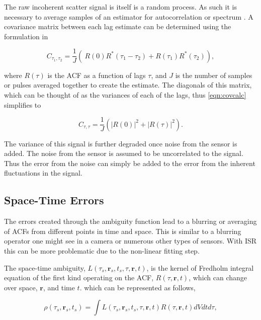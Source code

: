 \documentclass[draft,ras]{agutex}
\begin{document}
\begin{article}
The raw incoherent scatter signal is itself is a random process. As such it is necessary to average samples of an estimator for autocorrelation or spectrum \citep{Diaz:2008co}. A covariance matrix between each lag estimate can be determined using the formulation in \citep{hysell2008} 

\begin{equation}
\label{eqn:covcalc}
C_{\tau_1,\tau_2} = \frac{1}{J} \left( \ R(0)  R^*(\tau_1-\tau_2) +  R(\tau_1) R^*(\tau_2) \right),
\end{equation}

\noindent where $R(\tau)$ is the ACF as a function of lags $\tau$, and $J$ is the number of samples or pulses averaged together to create the estimate. The diagonals of this matrix, which can be thought of as the variances of each of the lags, thus \ref{eqn:covcalc} simplifies to

\begin{equation}
\label{eqn:covdiag}
C_{\tau,\tau} = \frac{1}{J} \left(  |R(0)|^2 +|R(\tau)|^2\right).
\end{equation}

The variance of this signal is further degraded once noise from the sensor is added. The noise from the sensor is assumed to be uncorrelated to the signal. Thus the error from the noise can simply be added to the error from the inherent fluctuations in the signal. 

\subsection{Space-Time Errors}

The errors created through the ambiguity function lead to a blurring or averaging of ACFs from different points in time and space. This is similar to a blurring operator one might see in a camera or numerous other types of sensors. With ISR this can be more problematic due to the non-linear fitting step.

The space-time ambiguity, $L(\tau_s,\mathbf{r}_s,t_s,\tau,\mathbf{r},t)$, is the kernel of Fredholm integral equation of the first kind operating on the ACF, $R(\tau,\mathbf{r},t)$, which can change over space, $\mathbf{r}$, and time $t$. which can be represented as follows,

 \begin{equation}
  \label{eqn:staf}
  \rho(\tau_s,\mathbf{r}_s,t_s) =\int L(\tau_s,\mathbf{r}_s,t_s,\tau,\mathbf{r},t)R(\tau,\mathbf{r},t)dVdtd\tau,
\end{equation}


\end{article}
\end{document}
